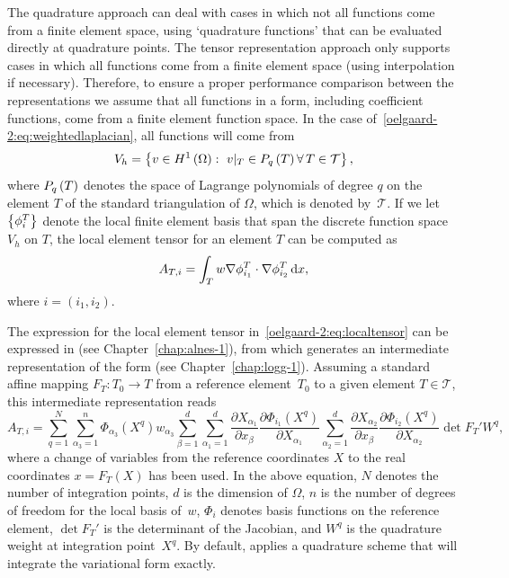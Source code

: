 The quadrature approach can deal with cases in which not all functions
come from a finite element space, using `quadrature functions' that
can be evaluated directly at quadrature points. The tensor
representation approach only supports cases in which all functions
come from a finite element space (using interpolation if necessary).
Therefore, to ensure a proper performance comparison between the
representations we assume that all functions in a form, including
coefficient functions, come from a finite element function space. In
the case of~\eqref{oelgaard-2:eq:weightedlaplacian}, all
functions will come from
%
\begin{equation}
  V_{h} = \left\{ {v \in H^{1}\left( {\Omega} \right): \ v\vert_T \in P_{q}\left( {T} \right)
    \forall\, T \in \mathcal{T}} \right\},
  \label{oelgaard-2:eq:space_H1}
\end{equation}
%
where $P_{q}\left( {T} \right)$ denotes the space of Lagrange polynomials of
degree $q$ on the element $T$ of the standard triangulation of
$\Omega$, which is denoted by~$\mathcal{T}$.  If we let
$\left\{ {\phi^{T}_{i}} \right\}$ denote the local finite element basis that span
the discrete function space $V_{h}$ on $T$, the local element tensor
for an element $T$ can be computed as
%
\begin{equation}
  A_{T,i} = \int_{T} w \nabla \phi^{T}_{i_1} \cdot \nabla
  \phi^{T}_{i_2} \, \mathrm{d}x,
  \label{oelgaard-2:eq:localtensor}
\end{equation}
%
where $i = (i_{1}, i_{2})$.

The expression for the local element tensor
in~\eqref{oelgaard-2:eq:localtensor} can be expressed in \ufl{} (see
Chapter~\ref{chap:alnes-1}), from which \ffc{} generates an
intermediate representation of the form (see
Chapter~\ref{chap:logg-1}).  Assuming a standard affine mapping $F_T :
T_0 \rightarrow T$ from a reference element~$T_{0}$ to a given element
$T \in \mathcal{T}$, this intermediate representation reads
%
\begin{equation}
  A_{T,i}
  =
  \sum_{q=1}^{N}
  \sum_{\alpha_{3}=1}^n
  \Phi_{\alpha_{3}}(X^q)
  w_{\alpha_{3}}
  \sum_{\beta=1}^d
  \sum_{\alpha_1=1}^d
  \frac{\partial X_{\alpha_1}}{\partial x_{\beta}}
  \frac{\partial \Phi_{i_1}(X^q)}{\partial X_{\alpha_1}}
  \sum_{\alpha_2=1}^d
  \frac{\partial X_{\alpha_2}}{\partial x_{\beta}}
  \frac{\partial \Phi_{i_2}(X^q)}{\partial X_{\alpha_2}}
  \det F_T'
  W^q,
\label{oelgaard-2:eq:weightedlaplacian_quadraturerepresentation}
\end{equation}
%
where a change of variables from the reference coordinates $X$ to the
real coordinates $x = F_T(X)$ has been used. In the above equation,
$N$ denotes the number of integration points, $d$ is the dimension of
$\Omega$, $n$ is the number of degrees of freedom for the local basis
of~$w$, $\Phi_{i}$ denotes basis functions on the reference element,
$\det F_T'$ is the determinant of the Jacobian, and $W^q$ is the
quadrature weight at integration point~$X^q$.  By default, \ffc{}
applies a quadrature scheme that will integrate the variational form
exactly.

